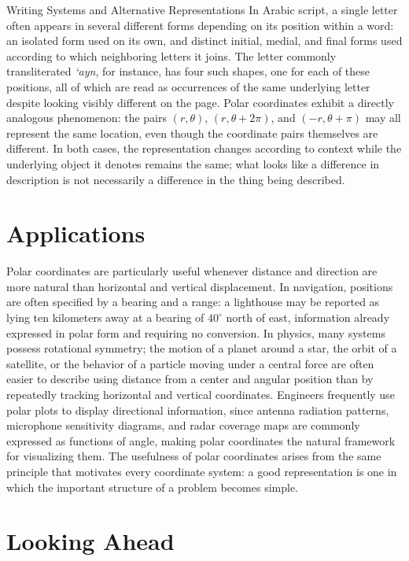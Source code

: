 \begin{sidebar}{Writing Systems and Alternative Representations}
In Arabic script, a single letter often appears in several different
forms depending on its position within a word: an isolated form used on
its own, and distinct initial, medial, and final forms used according to
which neighboring letters it joins. The letter commonly transliterated
\emph{`ayn}, for instance, has four such shapes, one for each of these
positions, all of which are read as occurrences of the same underlying
letter despite looking visibly different on the page. Polar coordinates
exhibit a directly analogous phenomenon: the pairs $(r,\theta)$,
$(r,\theta+2\pi)$, and $(-r,\theta+\pi)$ may all represent the same
location, even though the coordinate pairs themselves are different. In
both cases, the representation changes according to context while the
underlying object it denotes remains the same; what looks like a
difference in description is not necessarily a difference in the thing
being described.
\end{sidebar}

\section{Applications}

Polar coordinates are particularly useful whenever distance and direction
are more natural than horizontal and vertical displacement. In
navigation, positions are often specified by a bearing and a range: a
lighthouse may be reported as lying ten kilometers away at a bearing of
$40^\circ$ north of east, information already expressed in polar form
and requiring no conversion. In physics, many systems possess rotational
symmetry; the motion of a planet around a star, the orbit of a satellite,
or the behavior of a particle moving under a central force are often
easier to describe using distance from a center and angular position
than by repeatedly tracking horizontal and vertical coordinates.
Engineers frequently use polar plots to display directional information,
since antenna radiation patterns, microphone sensitivity diagrams, and
radar coverage maps are commonly expressed as functions of angle, making
polar coordinates the natural framework for visualizing them. The
usefulness of polar coordinates arises from the same principle that
motivates every coordinate system: a good representation is one in which
the important structure of a problem becomes simple.

\section{Looking Ahead}

